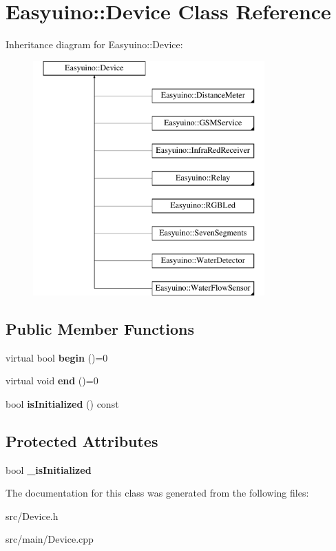 \hypertarget{class_easyuino_1_1_device}{}\section{Easyuino\+:\+:Device Class Reference}
\label{class_easyuino_1_1_device}
Inheritance diagram for Easyuino\+:\+:Device\+:\begin{figure}[H]
\begin{center}
\leavevmode
\includegraphics[height=9.000000cm]{class_easyuino_1_1_device}
\end{center}
\end{figure}
\subsection*{Public Member Functions}
\begin{DoxyCompactItemize}
\item 
\mbox{\label{class_easyuino_1_1_device_a2e7bb2fec849719a9d9432b57cdb72ba}} 
virtual bool {\bfseries begin} ()=0
\item 
\mbox{\label{class_easyuino_1_1_device_ab31018ef64adc84aa2ea575b2297548f}} 
virtual void {\bfseries end} ()=0
\item 
\mbox{\label{class_easyuino_1_1_device_a3761bc02cb81ca0833b535ecaf9a7659}} 
bool {\bfseries is\+Initialized} () const
\end{DoxyCompactItemize}
\subsection*{Protected Attributes}
\begin{DoxyCompactItemize}
\item 
\mbox{\label{class_easyuino_1_1_device_aa0b9574dae06ba9fc2180cba67d63126}} 
bool {\bfseries \+\_\+is\+Initialized}
\end{DoxyCompactItemize}


The documentation for this class was generated from the following files\+:\begin{DoxyCompactItemize}
\item 
src/Device.\+h\item 
src/main/Device.\+cpp\end{DoxyCompactItemize}
